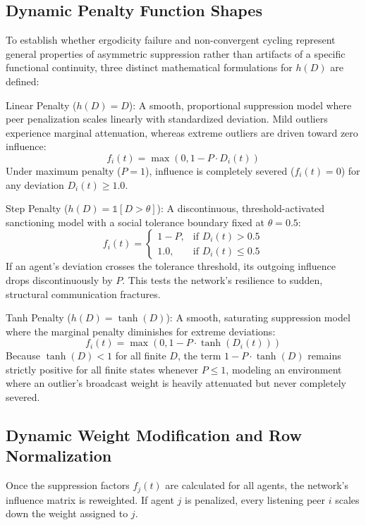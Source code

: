 \subsection{Dynamic Penalty Function Shapes}
To establish whether ergodicity failure and non-convergent cycling represent general properties of asymmetric suppression rather than artifacts of a specific functional continuity, three distinct mathematical formulations for $h(D)$ are defined\cite{degroot1974reaching}:

Linear Penalty ($h(D) = D$): A smooth, proportional suppression model where peer penalization scales linearly with standardized deviation\cite{degroot1974reaching}. Mild outliers experience marginal attenuation, whereas extreme outliers are driven toward zero influence\cite{degroot1974reaching}: $$f_i(t) = \max(0, 1 - P \cdot D_i(t))$$ Under maximum penalty ($P = 1$), influence is completely severed ($f_i(t) = 0$) for any deviation $D_i(t) \ge 1.0$\cite{acemoglu2013opinion}.

Step Penalty ($h(D) = \mathbb{1}[D > \theta]$): A discontinuous, threshold-activated sanctioning model with a social tolerance boundary fixed at $\theta = 0.5$\cite{degroot1974reaching}: $$f_i(t) = \begin{cases} 1 - P, & \text{if } D_i(t) > 0.5 \\ 1.0, & \text{if } D_i(t) \le 0.5 \end{cases}$$ If an agent's deviation crosses the tolerance threshold, its outgoing influence drops discontinuously by $P$\cite{degroot1974reaching}. This tests the network's resilience to sudden, structural communication fractures\cite{degroot1974reaching}.

Tanh Penalty ($h(D) = \tanh(D)$): A smooth, saturating suppression model where the marginal penalty diminishes for extreme deviations\cite{degroot1974reaching}: $$f_i(t) = \max(0, 1 - P \cdot \tanh(D_i(t)))$$ Because $\tanh(D) < 1$ for all finite $D$, the term $1 - P \cdot \tanh(D)$ remains strictly positive for all finite states whenever $P \le 1$, modeling an environment where an outlier's broadcast weight is heavily attenuated but never completely severed\cite{acemoglu2013opinion,hajnal1958weak}.

\subsection{Dynamic Weight Modification and Row Normalization}
Once the suppression factors $f_j(t)$ are calculated for all agents, the network's influence matrix is reweighted\cite{degroot1974reaching}. If agent $j$ is penalized, every listening peer $i$ scales down the weight assigned to $j$\cite{degroot1974reaching}.

